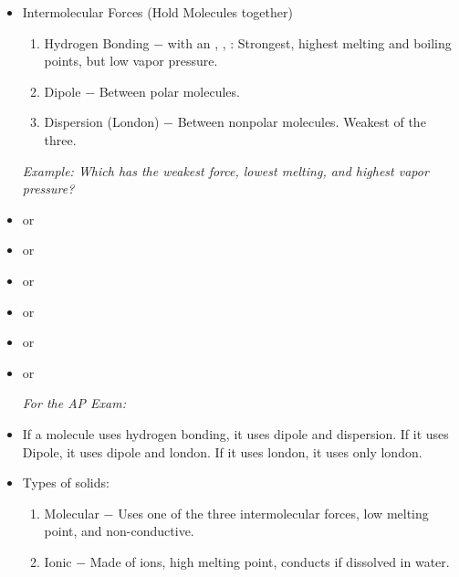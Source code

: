 \documentclass[12pt]{article}
\begin{document}
\begin{itemize}
\begin{enumerate}
  \end{enumerate}

\item Intermolecular Forces (Hold Molecules together)

  \begin{enumerate}

    \item Hydrogen Bonding $-$  with an , , : Strongest, highest melting and boiling points, but low vapor pressure.

    \item Dipole $-$ Between polar molecules.
      
      \item Dispersion (London) $-$ Between nonpolar molecules. Weakest of the three.

  \end{enumerate}

  \textit{Example: Which has the weakest force, lowest melting, and highest vapor pressure?}

\item {} or \underline{}

\item {} or \underline{}
  
\item {} or \underline{}
  
\item \underline{} or 

\item \underline{} or 

\item {} or \underline{}

  \textit{For the AP Exam:}

\item If a molecule uses hydrogen bonding, it uses dipole and dispersion. If it uses Dipole, it uses dipole and london. If it uses london, it uses only london.

\item Types of solids:

  \begin{enumerate}

    \item Molecular $-$ Uses one of the three intermolecular forces, low melting point, and non-conductive.

    \item Ionic $-$ Made of ions, high melting point, conducts if dissolved in water.


\end{enumerate}
\end{itemize}
\end{document}
